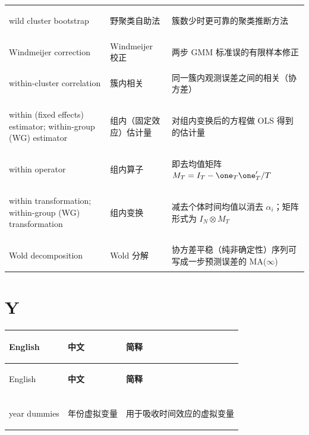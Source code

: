 \begin{longtable}{@{}>{\bfseries\boldmath\raggedright\arraybackslash}p{4.6cm}>{\raggedright\arraybackslash}p{3.2cm}>{\raggedright\arraybackslash}p{\dimexpr\textwidth-7.8cm-4\tabcolsep\relax}@{}}
wild cluster bootstrap & 野聚类自助法 & 簇数少时更可靠的聚类推断方法 \\
Windmeijer correction & Windmeijer 校正 & 两步 GMM 标准误的有限样本修正 \\
within-cluster correlation & 簇内相关 & 同一簇内观测误差之间的相关（协方差） \\
within (fixed effects) estimator; within-group (WG) estimator & 组内（固定效应）估计量 & 对组内变换后的方程做 OLS 得到的估计量 \\
within operator & 组内算子 & 即去均值矩阵 $M_T=I_T-\one_T\one_T'/T$ \\
within transformation; within-group (WG) transformation & 组内变换 & 减去个体时间均值以消去 $\alpha_i$；矩阵形式为 $I_N\otimes M_T$ \\
Wold decomposition & Wold 分解 & 协方差平稳（纯非确定性）序列可写成一步预测误差的 MA($\infty$) \\
\end{longtable}

\par{}\ifdim\dimexpr\pagegoal-\pagetotal\relax<16\baselineskip\newpage\fi
\section*{Y}
\begin{longtable}{@{}>{\bfseries\boldmath\raggedright\arraybackslash}p{4.6cm}>{\raggedright\arraybackslash}p{3.2cm}>{\raggedright\arraybackslash}p{\dimexpr\textwidth-7.8cm-4\tabcolsep\relax}@{}}
\toprule
English & \textbf{中文} & \textbf{简释}\\
\midrule
\endfirsthead
\toprule
English & \textbf{中文} & \textbf{简释}\\
\midrule
\endhead
\midrule
\multicolumn{3}{r@{}}{\footnotesize\itshape （续下页）}\\
\endfoot
\bottomrule
\endlastfoot
year dummies & 年份虚拟变量 & 用于吸收时间效应的虚拟变量 \\
\end{longtable}

\endgroup
